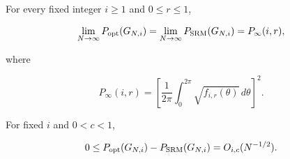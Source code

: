 \begin{theorem}\label{thm:fixed-length}
For every fixed integer \(i\ge1\) and \(0\le r\le1\),

\begin{equation}\label{eq:fixed-limit}
\lim_{N\to\infty}P_{\rm opt}(G_{N,i})
=\lim_{N\to\infty}P_{\rm SRM}(G_{N,i})
=P_\infty(i,r),
\end{equation}

where

\begin{equation}\label{eq:fixed-integral}
P_\infty(i,r)
=\left[
\frac1{2\pi}\int_0^{2\pi}\sqrt{f_{i,r}(\theta)}\,d\theta
\right]^2.
\end{equation}

For fixed \(i\) and \(0<c<1\),

\begin{equation}\label{eq:fixed-gap-rate}
0\le P_{\rm opt}(G_{N,i})-P_{\rm SRM}(G_{N,i})
=O_{i,c}(N^{-1/2}).
\end{equation}
\end{theorem}

